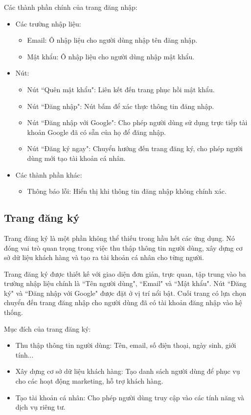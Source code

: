 Các thành phần chính của trang đăng nhập:
\begin{itemize}
    \item Các trường nhập liệu:
        \begin{itemize}
            \item Email: Ô nhập liệu cho người dùng nhập tên đăng nhập.
            \item Mật khẩu: Ô nhập liệu cho người dùng nhập mật khẩu.
        \end{itemize}
    \item Nút:
        \begin{itemize}
            \item Nút ``Quên mật khẩu": Liên kết đến trang phục hồi mật khẩu.
            \item Nút ``Đăng nhập": Nút bấm để xác thực thông tin đăng nhập.
            \item Nút ``Đăng nhập với Google": Cho phép người dùng sử dụng trực tiếp tài khoản Google đã có sẵn của họ để đăng nhập.
            \item Nút ``Đăng ký ngay": Chuyển hướng đến trang đăng ký, cho phép người dùng mới tạo tài khoản cá nhân.
        \end{itemize}
    \item Các thành phần khác:
        \begin{itemize}
            \item Thông báo lỗi: Hiển thị khi thông tin đăng nhập không chính xác.
        \end{itemize}
\end{itemize}


\subsection{Trang đăng ký}
Trang đăng ký là một phần không thể thiếu trong hầu hết các ứng dụng. Nó đóng vai trò quan trọng trong việc thu thập thông tin người dùng, xây dựng cơ sở dữ liệu khách hàng và tạo ra tài khoản cá nhân cho từng người.

Trang đăng ký được thiết kế với giao diện đơn giản, trực quan, tập trung vào ba trường nhập liệu chính là ``Tên người dùng", ``Email" và ``Mật khẩu". Nút ``Đăng ký" và ``Đăng nhập với Google" được đặt ở vị trí nổi bật. Cuối trang có lựa chọn chuyển đến trang đăng nhập cho người dùng đã có tài khoản đăng nhập vào hệ thống.

Mục đích của trang đăng ký:
\begin{itemize}
    \item Thu thập thông tin người dùng: Tên, email, số điện thoại, ngày sinh, giới tính...
    \item Xây dựng cơ sở dữ liệu khách hàng: Tạo danh sách người dùng để phục vụ cho các hoạt động marketing, hỗ trợ khách hàng.
    \item Tạo tài khoản cá nhân: Cho phép người dùng truy cập vào các tính năng và dịch vụ riêng tư.
\end{itemize}

